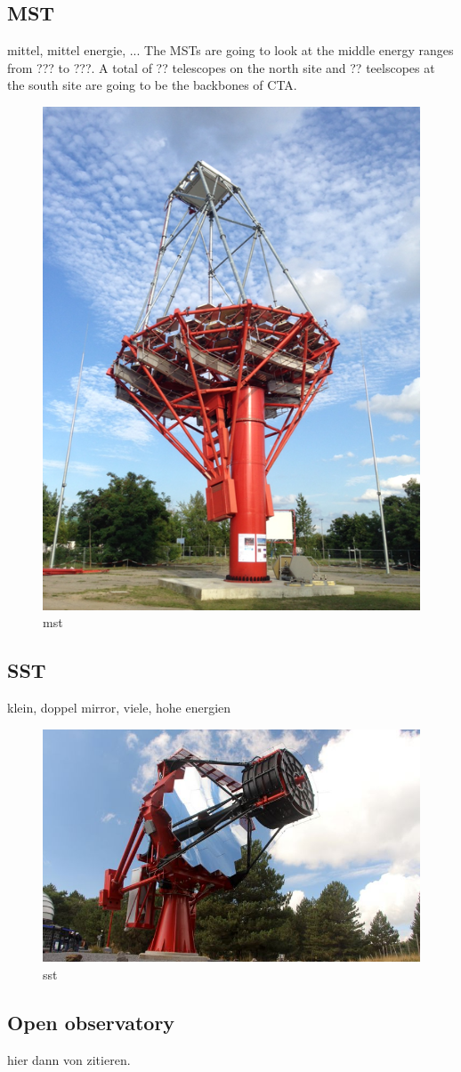 \subsection{MST}
mittel, mittel energie, ...
The MSTs are going to look at the middle energy ranges from ??? to ???.
A total of ?? telescopes on the north site and ?? teelscopes at the south site 
are going to be the backbones of CTA.

\begin{figure}
	\center
	\includegraphics[width=.5\textwidth]{images/mst.png}
	\caption{mst \cite{cta_web}}
	\label{fig:mst}
\end{figure}

\subsection{SST}
klein, doppel mirror, viele, hohe energien

\begin{figure}
	\center
	\includegraphics[width=.5\textwidth]{images/sst.jpg}
	\caption{sst \cite{cta_web}}
	\label{fig:sst}
\end{figure}



\subsection{Open observatory}
hier dann von \cite{actis2011design} zitieren.

